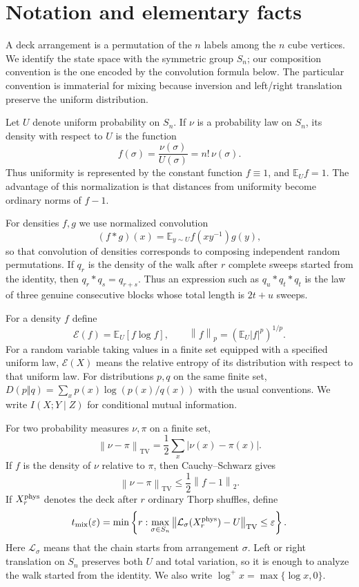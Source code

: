 \documentclass[11pt]{article}
\numberwithin{equation}{section}
\theoremstyle{definition}\newtheorem{definition}[theorem]{Definition}
\theoremstyle{remark}\newtheorem{remark}[theorem]{Remark}
\newcommand{\E}{\mathbb E}
\newcommand{\Ent}{\mathcal E}
\newcommand{\TV}{\mathrm{TV}}
\newcommand{\mix}{\mathrm{mix}}
\newcommand{\norm}[1]{\left\lVert#1\right\rVert}
\begin{document}
\section{Notation and elementary facts}\label{sec:notation}

A deck arrangement is a permutation of the $n$ labels among the $n$ cube
vertices.  We identify the state space with the symmetric group $S_n$; our
composition convention is the one encoded by the convolution formula below.
The particular convention is immaterial for mixing because inversion and
left/right translation preserve the uniform distribution.

Let $U$ denote uniform probability on $S_n$.  If $\nu$ is a probability law on
$S_n$, its density with respect to $U$ is the function
\[
 f(\sigma)=\frac{\nu(\sigma)}{U(\sigma)}=n!\,\nu(\sigma).
\]
Thus uniformity is represented by the constant function $f\equiv1$, and
$\E_U f=1$.  The advantage of this normalization is that distances from
uniformity become ordinary norms of $f-1$.

For densities $f,g$ we use normalized convolution
\[
 (f*g)(x)=\E_{y\sim U} f(xy^{-1})g(y),
\]
so that convolution of densities corresponds to composing independent random
permutations.  If $q_r$ is the density of the walk after $r$ complete sweeps
started from the identity, then $q_r*q_s=q_{r+s}$.  Thus an expression such as
$q_u*q_t*q_t$ is the law of three genuine consecutive blocks whose total
length is $2t+u$ sweeps.

For a density $f$ define
\[
 \Ent(f)=\E_U[f\log f],\qquad
 \norm f_p=(\E_U|f|^p)^{1/p}.
\]
For a random variable taking values in a finite set equipped with a specified
uniform law, $\Ent(X)$ means the relative entropy of its distribution with
respect to that uniform law.  For distributions $p,q$ on the same finite set,
$D(p\Vert q)=\sum_xp(x)\log(p(x)/q(x))$ with the usual conventions.
We write $I(X;Y\mid Z)$ for conditional mutual information.

For two probability measures $\nu,\pi$ on a finite set,
\[
 \norm{\nu-\pi}_{\TV}=\frac12\sum_x|\nu(x)-\pi(x)|.
\]
If $f$ is the density of $\nu$ relative to $\pi$, then Cauchy--Schwarz gives
\begin{equation}\label{eq:TV-L2}
 \norm{\nu-\pi}_{\TV}\le\frac12\norm{f-1}_2.
\end{equation}
If $X_r^{\rm phys}$ denotes the deck after $r$ ordinary Thorp shuffles, define
\[
 t_{\mix}(\varepsilon)=
 \min\left\{r:\max_{\sigma\in S_n}
 \norm{\mathcal L_\sigma(X_r^{\rm phys})-U}_{\TV}\le\varepsilon\right\}.
\]
Here $\mathcal L_\sigma$ means that the chain starts from arrangement $\sigma$.
Left or right translation on $S_n$ preserves both $U$ and total variation, so
it is enough to analyze the walk started from the identity.  We also write
$\log^+x=\max\{\log x,0\}$.
\end{document}
